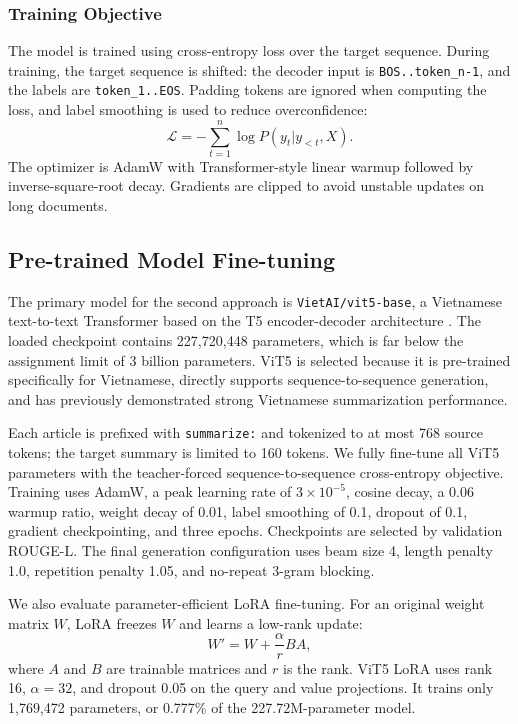 \documentclass[conference]{IEEEtran}
\begin{document}
\subsubsection{Training Objective}
The model is trained using cross-entropy loss over the target sequence. During training, the target sequence is shifted: the decoder input is \texttt{BOS..token\_n-1}, and the labels are \texttt{token\_1..EOS}. Padding tokens are ignored when computing the loss, and label smoothing is used to reduce overconfidence:
\begin{equation}
\mathcal{L} = -\sum_{t=1}^{n} \log P(y_t | y_{<t}, X).
\end{equation}
The optimizer is AdamW with Transformer-style linear warmup followed by inverse-square-root decay. Gradients are clipped to avoid unstable updates on long documents.

\subsection{Pre-trained Model Fine-tuning}
The primary model for the second approach is \texttt{VietAI/vit5-base}, a Vietnamese text-to-text Transformer based on the T5 encoder-decoder architecture \cite{raffel2020t5,phan2022vit5}. The loaded checkpoint contains 227,720,448 parameters, which is far below the assignment limit of 3 billion parameters. ViT5 is selected because it is pre-trained specifically for Vietnamese, directly supports sequence-to-sequence generation, and has previously demonstrated strong Vietnamese summarization performance.

Each article is prefixed with \texttt{summarize:} and tokenized to at most 768 source tokens; the target summary is limited to 160 tokens. We fully fine-tune all ViT5 parameters with the teacher-forced sequence-to-sequence cross-entropy objective. Training uses AdamW, a peak learning rate of $3\times10^{-5}$, cosine decay, a 0.06 warmup ratio, weight decay of 0.01, label smoothing of 0.1, dropout of 0.1, gradient checkpointing, and three epochs. Checkpoints are selected by validation ROUGE-L. The final generation configuration uses beam size 4, length penalty 1.0, repetition penalty 1.05, and no-repeat 3-gram blocking.

We also evaluate parameter-efficient LoRA fine-tuning. For an original weight matrix $W$, LoRA freezes $W$ and learns a low-rank update:
\begin{equation}
W' = W + \frac{\alpha}{r}BA,
\end{equation}
where $A$ and $B$ are trainable matrices and $r$ is the rank. ViT5 LoRA uses rank 16, $\alpha=32$, and dropout 0.05 on the query and value projections. It trains only 1,769,472 parameters, or 0.777\% of the 227.72M-parameter model.
\end{document}
